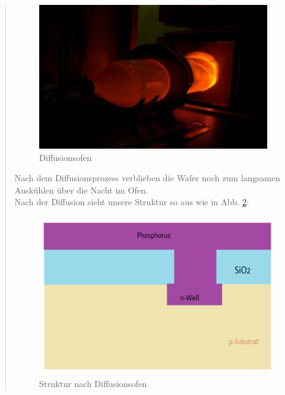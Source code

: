 \begin{quote}
		\vspace{2em}
            
    		\begin{figure}[H]
				\hspace{4 cm}
                \includegraphics[scale=0.75, trim = 0cm 0cm 0cm 0cm,clip]
                	{./HerstellungBilder/diffusionsofen.png}
                  \caption{Diffusionsofen}
                \label{fig:diff_ofen}
            \end{figure}
            
    	\vspace{2em}
	
		Nach dem Diffusionsprozess verblieben die Wafer noch zum langsamen 
		Auskühlen über die Nacht im Ofen.\\
	
		Nach der Diffusion sieht unsere Struktur so aus wie in Abb. 
		\ref{fig:nach_diff_ofen}:
	
		\vspace{2em}
            
    		\begin{figure}[H]
				\hspace{4 cm}
                \includegraphics[scale=0.7, trim = 0cm 0cm 0cm 0cm,clip]
                	{./HerstellungBilder/StrukturnachDiffusionsofen.png}
                  \caption{Struktur nach Diffusionsofen}
                \label{fig:nach_diff_ofen}
            \end{figure}
            

\end{quote}
